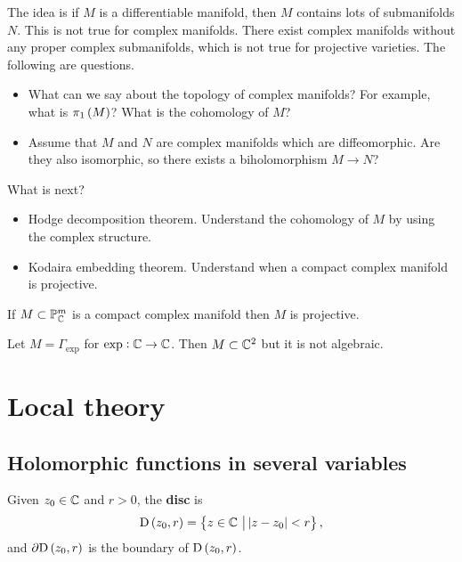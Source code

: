 The idea is if $ M $ is a differentiable manifold, then $ M $ contains lots of submanifolds $ N $. This is not true for complex manifolds. There exist complex manifolds without any proper complex submanifolds, which is not true for projective varieties. The following are questions.
\begin{itemize}
\item What can we say about the topology of complex manifolds? For example, what is $ \pi_1\br{M} $? What is the cohomology of $ M $?
\item Assume that $ M $ and $ N $ are complex manifolds which are diffeomorphic. Are they also isomorphic, so there exists a biholomorphism $ M \to N $?
\end{itemize}
What is next?
\begin{itemize}
\item Hodge decomposition theorem. Understand the cohomology of $ M $ by using the complex structure.
\item Kodaira embedding theorem. Understand when a compact complex manifold is projective.
\end{itemize}

\begin{note*}
If $ M \subset \mathbb{P}_{\mathbb{C}}^m $ is a compact complex manifold then $ M $ is projective.
\end{note*}

\begin{example*}
Let $ M = \Gamma_{\exp} $ for $ \exp : \mathbb{C} \to \mathbb{C} $. Then $ M \subset \mathbb{C}^2 $ but it is not algebraic.
\end{example*}

\pagebreak

\section{Local theory}

\subsection{Holomorphic functions in several variables}


\begin{notation}
Given $ z_0 \in \mathbb{C} $ and $ r > 0 $, the \textbf{disc} is
$$ \D\br{z_0, r} = \cbr{z \in \CC \st \abs{z - z_0} < r}, $$
and $ \da\D\br{z_0, r} $ is the boundary of $ \D\br{z_0, r} $.
\end{notation}

